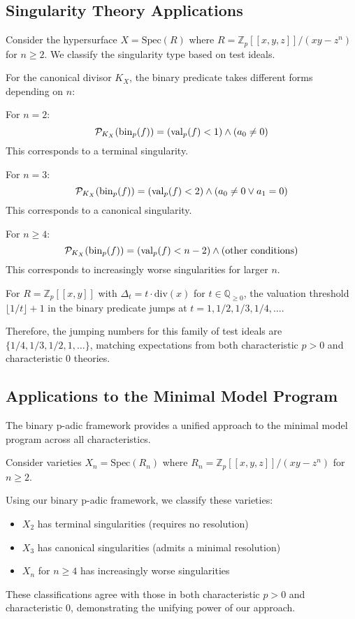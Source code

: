 \subsection{Singularity Theory Applications}

\begin{example}\label{ex:singularity-classification}
Consider the hypersurface $X = \text{Spec}(R)$ where $R = \mathbb{Z}_p[[x,y,z]]/(xy-z^n)$ for $n \geq 2$. We classify the singularity type based on test ideals.

For the canonical divisor $K_X$, the binary predicate takes different forms depending on $n$:

For $n = 2$:
$$\mathcal{P}_{K_X}(\operatorname{bin}_p(f)) = (\operatorname{val}_p(f) < 1) \wedge (a_0 \neq 0)$$
This corresponds to a terminal singularity.

For $n = 3$:
$$\mathcal{P}_{K_X}(\operatorname{bin}_p(f)) = (\operatorname{val}_p(f) < 2) \wedge (a_0 \neq 0 \vee a_1 = 0)$$
This corresponds to a canonical singularity.

For $n \geq 4$:
$$\mathcal{P}_{K_X}(\operatorname{bin}_p(f)) = (\operatorname{val}_p(f) < n-2) \wedge (\text{other conditions})$$
This corresponds to increasingly worse singularities for larger $n$.
\end{example}

\begin{example}\label{ex:jumping-numbers}
For $R = \mathbb{Z}_p[[x,y]]$ with $\Delta_t = t \cdot \text{div}(x)$ for $t \in \mathbb{Q}_{\geq 0}$, the valuation threshold $\lfloor 1/t \rfloor + 1$ in the binary predicate jumps at $t = 1, 1/2, 1/3, 1/4, \ldots$.

Therefore, the jumping numbers for this family of test ideals are $\{1/4, 1/3, 1/2, 1, \ldots\}$, matching expectations from both characteristic $p > 0$ and characteristic 0 theories.
\end{example}

\subsection{Applications to the Minimal Model Program}

The binary p-adic framework provides a unified approach to the minimal model program across all characteristics.

\begin{example}\label{ex:mmp-classifications}
Consider varieties $X_n = \text{Spec}(R_n)$ where $R_n = \mathbb{Z}_p[[x,y,z]]/(xy-z^n)$ for $n \geq 2$.

Using our binary p-adic framework, we classify these varieties:
\begin{itemize}
    \item $X_2$ has terminal singularities (requires no resolution)
    \item $X_3$ has canonical singularities (admits a minimal resolution)
    \item $X_n$ for $n \geq 4$ has increasingly worse singularities
\end{itemize}

These classifications agree with those in both characteristic $p > 0$ and characteristic 0, demonstrating the unifying power of our approach.
\end{example}

